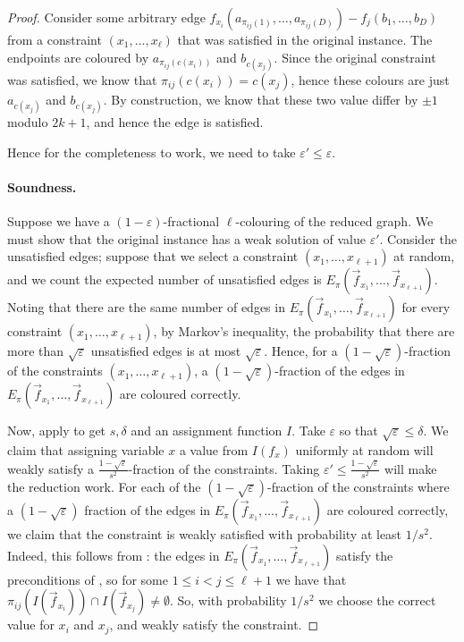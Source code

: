 \documentclass[a4paper,11pt, DIV=11]{scrartcl}
\renewcommand{\epsilon}{\varepsilon}
\theoremstyle{plain}
\theoremstyle{definition}
\begin{document}
\begin{proof}
Consider some arbitrary edge $f_{x_i}(a_{\pi_{ij}(1)}, \ldots, a_{\pi_{ij}(D)}) - f_j(b_1, \ldots, b_D)$ from a constraint $(x_1, \ldots, x_\ell)$ that was satisfied in the original instance. The endpoints are coloured by $a_{\pi_{ij}(c(x_i))}$ and $b_{c(x_j)}$. Since the original constraint was satisfied, we know that $\pi_{ij}(c(x_i)) = c(x_j)$, hence these colours are just $a_{c(x_j)}$ and $b_{c(x_j)}$. By construction, we know that these two value differ by $\pm 1$ modulo $2k + 1$, and hence the edge is satisfied.

Hence for the completeness to work, we need to take $\epsilon' \leq \epsilon$.

\paragraph{Soundness.} Suppose we have a $(1-\epsilon)$-fractional $\ell$-colouring of the reduced graph. We must show that the original instance has a weak solution of value $\epsilon'$.
Consider the unsatisfied edges; suppose that we select a constraint $(x_1, \ldots, x_{\ell + 1})$ at random, and we count the expected number of unsatisfied edges is $E_\pi(\vec{f}_{x_1}, \ldots, \vec{f}_{x_{\ell + 1}})$. Noting that there are the same number of edges in $E_\pi(\vec{f}_{x_1}, \ldots, \vec{f}_{x_{\ell + 1}})$ for every constraint $(x_1, \ldots, x_{\ell + 1})$, by Markov's inequality, the probability that there are more than $\sqrt{\epsilon}$ unsatisfied edges is at most $\sqrt{\epsilon}$. Hence, for a $(1 - \sqrt{\epsilon})$-fraction of the constraints $(x_1, \ldots, x_{\ell + 1})$, a $(1 - \sqrt{\epsilon})$-fraction of the edges in $E_\pi(\vec{f}_{x_1}, \ldots, \vec{f}_{x_{\ell + 1}})$ are coloured correctly.

Now, apply  to get $s, \delta$ and an assignment function $I$. Take $\epsilon$ so that $\sqrt{\epsilon} \leq \delta$. We claim that assigning variable $x$ a value from $I(f_x)$ uniformly at random will weakly satisfy a $\frac{1 - \sqrt{\epsilon}}{s^2}$-fraction of the constraints. Taking $\epsilon' \leq \frac{1 - \sqrt{\epsilon}}{s^2}$ will make the reduction work. For each of the $(1 - \sqrt{\epsilon})$-fraction of the constraints where a $(1 - \sqrt{\epsilon})$ fraction of the edges in $E_\pi(\vec{f}_{x_1}, \ldots, \vec{f}_{x_{\ell + 1}})$ are coloured correctly,  we claim that the constraint is weakly satisfied with probability at least $1 / s^2$. Indeed, this follows from : the edges in $E_\pi(\vec{f}_{x_1}, \ldots, \vec{f}_{x_{\ell+1}})$ satisfy the preconditions of , so for some $1 \leq i < j \leq \ell + 1$ we have that $\pi_{ij}(I(\vec{f}_{x_i})) \cap I(\vec{f}_{x_j}) \neq \emptyset$. So, with probability $1 / s^2$ we choose the correct value for $x_i$ and $x_j$, and weakly satisfy the constraint.
\end{proof}
\end{document}
